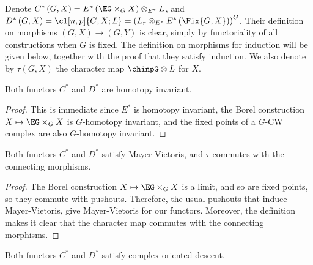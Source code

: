 Denote $C^*\left(G, X\right) = E^*\left(\EG \times_G X\right) \otimes_{E^*} L$,
and $D^*\left(G, X\right) = \cl[n,p]{G,X; L} = \left(L_r \otimes_{E^*} E^*\left(\Fix{G,X}\right)\right)^G$.
Their definition on morphisms $\left(G, X\right) \to \left(G, Y\right)$ is clear, simply by functoriality of all constructions when $G$ is fixed.
The definition on morphisms for induction will be given below, together with the proof that they satisfy induction.
We also denote by $\tau\left(G, X\right)$ the character map $\chinpG \otimes L$ for $X$.

\begin{lemma}
	Both functors $C^*$ and $D^*$ are homotopy invariant.
\end{lemma}

\begin{proof}
	This is immediate since $E^*$ is homotopy invariant, the Borel construction $X \mapsto \EG \times_G X$ is $G$-homotopy invariant, and the fixed points of a $G$-CW complex are also $G$-homotopy invariant.
\end{proof}

\begin{lemma}
	Both functors $C^*$ and $D^*$ satisfy Mayer-Vietoris, and $\tau$ commutes with the connecting morphisms.
\end{lemma}

\begin{proof}
	The Borel construction $X \mapsto \EG \times_G X$ is a limit, and so are fixed points, so they commute with pushouts.
	Therefore, the usual pushouts that induce Mayer-Vietoris, give Mayer-Vietoris for our functors.
	Moreover, the definition makes it clear that the character map commutes with the connecting morphisms.
\end{proof}

\begin{lemma}
	Both functors $C^*$ and $D^*$ satisfy complex oriented descent.
\end{lemma}

